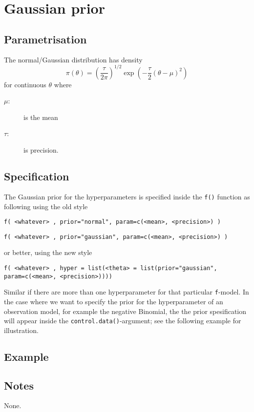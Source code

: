 \documentclass[a4paper,11pt]{article}
\begin{document}
\section*{Gaussian prior}

\subsection*{Parametrisation}
The normal/Gaussian distribution has density
\begin{equation}
    \pi(\theta)=\left(\frac{\tau}{2\pi}\right)^{1/2}
    \exp\left(-\frac{\tau}{2}(\theta-\mu)^2\right)
\end{equation}
for continuous $\theta$ where
\begin{description}
\item[$\mu$:] is the mean
\item[$\tau$:] is precision.
\end{description}

\subsection*{Specification}
The Gaussian prior for the hyperparameters is specified inside the
\texttt{f()} function as following using the old style
\begin{center}
    \texttt{f( <whatever> , prior="normal", param=c(<mean>, <precision>) )}
\end{center}
\begin{center}
    \texttt{f( <whatever> , prior="gaussian", param=c(<mean>, <precision>) )}
\end{center}
or better, using the new style
\begin{center}
    \texttt{f( <whatever> , hyper = list(<theta> = list(prior="gaussian", param=c(<mean>, <precision>))))}
\end{center}
Similar if there are more than one hyperparameter for that particular
\texttt{f}-model. In the case where we want to specify the prior for
the hyperparameter of an observation model, for example the negative
Binomial, the the prior spesification will appear inside the
\texttt{control.data()}-argument; see the following example for
illustration.

\subsection*{Example}


\subsection*{Notes}

None.
\end{document}
